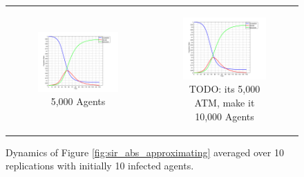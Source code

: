 \begin{figure}
\begin{center}
\begin{tabular}{c c}
    	\\
    	
		\begin{subfigure}[b]{0.3\textwidth}
			\centering
			\includegraphics[width=1\textwidth, angle=0]{./../shared/fig/frabs/SIR_5000agents_150t_01dt_NOSS_parallel_10replications.png}
			\caption{5,000 Agents}
			\label{fig:sir_abs_agents_repls_5000}
		\end{subfigure}
		&
		\begin{subfigure}[b]{0.3\textwidth}
			\centering
			\includegraphics[width=1\textwidth, angle=0]{./../shared/fig/frabs/SIR_5000agents_150t_01dt_NOSS_parallel_10replications.png}
			\caption{TODO: its 5,000 ATM, make it 10,000 Agents}
			\label{fig:sir_abs_agents_repls_10000}
		\end{subfigure}
	\end{tabular}
	
	\caption{Dynamics of Figure \ref{fig:sir_abs_approximating} averaged over 10 replications with initially 10 infected agents.} 
	\label{fig:sir_abs_agents_repls}
\end{center}
\end{figure}

